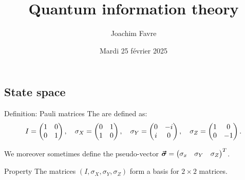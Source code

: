 \documentclass[a4paper]{article}
\title{Quantum information theory }
\author{Joachim Favre}
\date{Mardi 25 février 2025}
\begin{document}
\maketitle


\subsection{State space}

\begin{parag}{Definition: Pauli matrices}
    The  are defined as: 
    \[I = \begin{pmatrix} 1 & 0 \\ 0 & 1 \end{pmatrix}, \quad \sigma_X = \begin{pmatrix} 0 & 1 \\ 1 & 0 \end{pmatrix}, \quad \sigma_Y = \begin{pmatrix} 0 & -i \\ i & 0 \end{pmatrix}, \quad \sigma_Z = \begin{pmatrix} 1 & 0 \\ 0 & -1 \end{pmatrix}.\]

    We moreover sometimes define the pseudo-vector $\bm{\protect\vec{\sigma}} = \begin{pmatrix} \sigma_x & \sigma_Y & \sigma_Z \end{pmatrix}^T$.
    
    \begin{subparag}{Property}
        The matrices $\left(I, \sigma_X, \sigma_Y, \sigma_Z\right)$ form a basis for $2 \times 2$ matrices.
    \end{subparag}
\end{parag}
\end{document}
